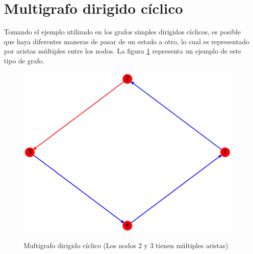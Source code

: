 \documentclass{article}
\begin{document}

\section{Multigrafo dirigido cíclico}
Tomando el ejemplo utilizado en los grafos simples dirigidos cíclicos, es posible que haya diferentes maneras de pasar de un estado a otro, lo cual es representado por aristas múltiples entre los nodos. La figura \ref{fig:MDC} representa un ejemplo de este tipo de grafo.
\begin{figure}[h!]
    \caption{Multigrafo dirigido cíclico (Los nodos 2 y 3 tienen múltiples aristas)}
    \includegraphics[width=\textwidth]{11-MDC}
    \label{fig:MDC}
\end{figure}



\end{document}
